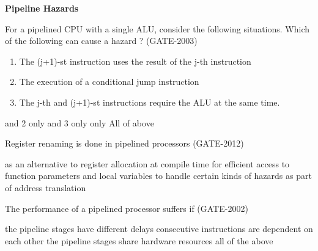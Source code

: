 
\centerline{\textbf{ \LARGE Pipeline Hazards}}


\begin{questyle}
  \question  For a pipelined CPU with a single ALU, consider the following situations. Which of the
            following can cause a hazard ?  (GATE-2003)

  \begin{enumerate}
    \item The (j+1)-st instruction uses the result of the j-th instruction
    \item The execution of a conditional jump instruction
    \item The j-th and (j+1)-st instructions require the ALU at the same time.
  \end{enumerate}

  \begin{oneparchoices}
     and 2 only
     and 3 only
     only
    \CorrectChoice  All of above
  \end{oneparchoices}
\end{questyle}


\begin{questyle}
  \question  Register renaming is done in pipelined processors  (GATE-2012)

  \begin{choices}
    \choice         as an alternative to register allocation at compile time
    \choice         for efficient access to function parameters and local variables
    \CorrectChoice  to handle certain kinds of hazards
    \choice         as part of address translation
  \end{choices}
\end{questyle}


\begin{questyle}
  \question  The performance of a pipelined processor suffers if  (GATE-2002)

  \begin{choices}
    \choice         the pipeline stages have different delays
    \choice         consecutive instructions are dependent on each other
    \choice         the pipeline stages share hardware resources
    \CorrectChoice  all of the above
  \end{choices}
\end{questyle}


